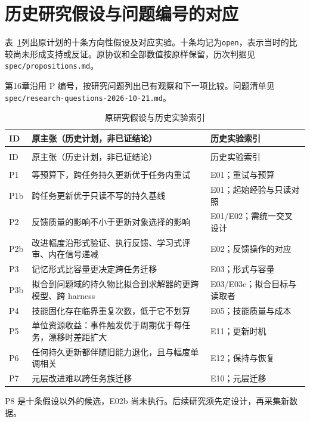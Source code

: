 \section{历史研究假设与问题编号的对应}
\label{sec:appg-history}

表~\ref{tab:appg-historical-claims}列出原计划的十条方向性假设及对应实验。十条均记为\texttt{open}，表示当时的比较尚未形成支持或反证。原协议和全部数值按原样保留，历次判据见\nolinkurl{spec/propositions.md}。

第16章沿用 P 编号，按研究问题列出已有观察和下一项比较。问题清单见\nolinkurl{spec/research-questions-2026-10-21.md}。

\begin{small}
\begin{longtable}{>{\raggedright\arraybackslash}p{0.7cm}>{\raggedright\arraybackslash}p{7.0cm}>{\raggedright\arraybackslash}p{3.8cm}}
\caption{原研究假设与历史实验索引}\label{tab:appg-historical-claims}\\
\toprule
ID & 原主张（历史计划，非已证结论） & 历史实验索引 \\
\midrule\endfirsthead
\multicolumn{3}{l}{表\thetable（续）}\\
\toprule ID & 原主张（历史计划，非已证结论） & 历史实验索引 \\
\midrule\endhead
\midrule\multicolumn{3}{r}{续下页}\\\endfoot
\bottomrule\endlastfoot
P1 & 等预算下，跨任务持久更新优于任务内重试 & E01；重试与预算 \\
P1b & 跨任务更新优于只读不写的持久基线 & E01；起始经验与只读对照 \\
P2 & 反馈质量的影响不小于更新对象选择的影响 & E01/E02；需统一交叉设计 \\
P2b & 改进幅度沿形式验证、执行反馈、学习式评审、内在信号递减 & E02；反馈操作的对应 \\
P3 & 记忆形式比容量更决定跨任务迁移 & E03；形式与容量 \\
P3b & 拟合到问题域的持久物比拟合到求解器的更跨模型、跨 harness & E03/E03c；拟合目标与读取者 \\
P4 & 技能固化存在临界重复次数，低于它不划算 & E05；技能质量与成本 \\
P5 & 单位资源收益：事件触发优于周期优于每任务，漂移时差距扩大 & E11；更新时机 \\
P6 & 任何持久更新都伴随旧能力退化，且与幅度单调相关 & E12；保持与恢复 \\
P7 & 元层改进难以跨任务族迁移 & E10；元层迁移 \\
\end{longtable}
\end{small}

P8 是十条假设以外的候选，E02b 尚未执行。后续研究须先定设计，再采集新数据。
